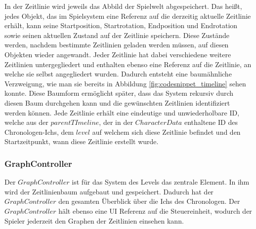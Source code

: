 In der Zeitlinie wird jeweils das Abbild der Spielwelt abgespeichert. Das heißt, jedes Objekt, das im Spielsystem eine Referenz auf die derzeitig aktuelle Zeitlinie erhält, kann seine Startposition, Startrotation, Endposition und Endrotation sowie seinen aktuellen Zustand auf der Zeitlinie speichern. Diese Zustände werden, nachdem bestimmte Zeitlinien geladen werden müssen, auf diesen Objekten wieder angewandt. Jeder Zeitlinie hat dabei verschiedene weitere Zeitlinien untergegliedert und enthalten ebenso eine Referenz auf die Zeitlinie, an welche sie selbst angegliedert wurden. Dadurch entsteht eine baumähnliche Verzweigung, wie man sie bereits in Abbildung \ref{fig:codesnippet_timeline} sehen konnte. Diese Baumform ermöglicht später, dass das System rekursiv durch diesen Baum durchgehen kann und die gewünschten Zeitlinien identifiziert werden können. Jede Zeitlinie erhält eine eindeutige und unwiederholbare \ac{ID}, welche aus der $parentTImeline$, der in der $CharacterData$ enthaltene \ac{ID} des Chronologen-Ichs, dem $level$ auf welchem sich diese Zeitlinie befindet und den Startzeitpunkt, wann diese Zeitlinie erstellt wurde.
\subsubsection{GraphController}
Der $GraphController$ ist für das System des Levels das zentrale Element. In ihm wird der Zeitlinienbaum aufgebaut und gespeichert. Dadurch hat der $GraphController$ den gesamten Überblick über die Ichs des Chronologen. Der $GraphController$ hält ebenso eine \ac{UI} Referenz auf die Steuereinheit, wodurch der Spieler jederzeit den Graphen der Zeitlinien einsehen kann.

